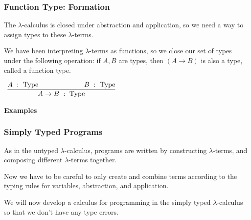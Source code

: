\documentclass{beamer}
\theoremstyle{indentDefn} \newtheorem{defn}[]{Definition}
\begin{document}
\begin{frame}
	\frametitle{Function Type: Formation}

  The $\lambda$-calculus is closed under abstraction and application, so we need a way to assign types to these $\lambda$-terms. 
  
  We have been interpreting $\lambda$-terms as functions, so we close our set of types under the following operation: if $A,B$ are types, then $(A\to B)$ is also a type, called a function type. 
  
  \vspace{5mm}
  
  \begin{center}
  	$\begin{array}{c}
  		\infer[]{A \to B  \ : \ \text{Type}}
  			{A  \ : \ \text{Type}
  			\hspace{10mm}&\hspace{10mm}
  			 B  \ : \ \text{Type}}
  	\end{array}$  
  \end{center}

  {\bf Examples}

  \vspace{30mm}





\end{frame}

\begin{frame}
  \frametitle{Simply Typed Programs}

  As in the untyped $\lambda$-calculus, programs are written by constructing $\lambda$-terms, and composing different $\lambda$-terms together. 
  
  Now we have to be careful to only create and combine terms according to the typing rules for variables, abstraction, and application. 

  We will now develop a calculus for programming in the simply typed $\lambda$-calculus so that we don't have any type errors. 

	\vspace{50mm}

\end{frame}
\end{document}
